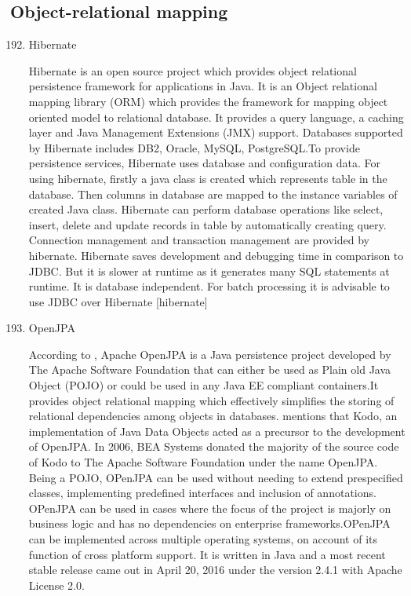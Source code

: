 \subsection{Object-relational mapping}
\label{\detokenize{i524/technologies:object-relational-mapping}}\begin{enumerate}
\setcounter{enumi}{191}
\item {} 
Hibernate

Hibernate is an open source project which provides object
relational persistence framework for applications in Java. It is
an Object relational mapping library (ORM) which provides the
framework for mapping object oriented model to relational
database. It provides a query language, a caching layer and Java
Management Extensions (JMX) support. Databases supported by
Hibernate includes DB2, Oracle, MySQL, PostgreSQL.To provide
persistence services, Hibernate uses database and configuration
data. For using hibernate, firstly a java class is created which
represents table in the database. Then columns in database are
mapped to the instance variables of created Java class. Hibernate
can perform database operations like select, insert, delete and
update records in table by automatically creating
query. Connection management and transaction management are
provided by hibernate.  Hibernate saves development and debugging
time in comparison to JDBC.  But it is slower at runtime as it
generates many SQL statements at runtime. It is database
independent. For batch processing it is advisable to use JDBC
over Hibernate {[}hibernate{]}

\item {} 
OpenJPA

According to \label{\detokenize{i524/technologies:id354}}{\hyperref[\detokenize{i524/technologies:www-openjpa}]{\sphinxcrossref{{[}302{]}}}}, Apache OpenJPA is a Java
persistence project developed by The Apache Software Foundation that
can either be used as Plain old Java Object (POJO) or could be used in
any Java EE compliant containers.It provides object relational mapping
which effectively simplifies the storing of relational dependencies
among objects in databases. \label{\detokenize{i524/technologies:id355}}{\hyperref[\detokenize{i524/technologies:www-openjpa-wiki}]{\sphinxcrossref{{[}303{]}}}} mentions that
Kodo, an implementation of Java Data Objects acted as a precursor to
the development of OpenJPA. In 2006, BEA Systems donated the majority
of the source code of Kodo to The Apache Software Foundation under the
name OpenJPA. Being a POJO, OPenJPA can be used without needing to
extend prespecified classes, implementing predefined interfaces and
inclusion of annotations. OPenJPA can be used in cases where the focus
of the project is majorly on business logic and has no dependencies on
enterprise frameworks.OPenJPA can be implemented across multiple
operating systems, on account of its function of cross platform
support. It is written in Java and a most recent stable release came
out in April 20, 2016 under the version 2.4.1 with Apache License 2.0.


\end{enumerate}
